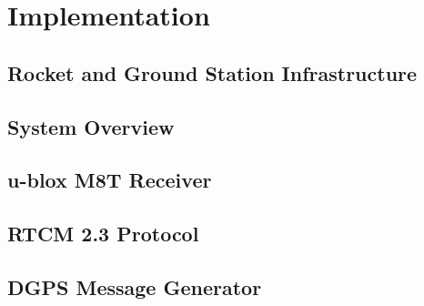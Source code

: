 \chapter{Implementation}




\section{Rocket and Ground Station Infrastructure}

\section{System Overview}

\section{u-blox M8T Receiver}

\section{RTCM 2.3 Protocol}

\section{DGPS Message Generator}